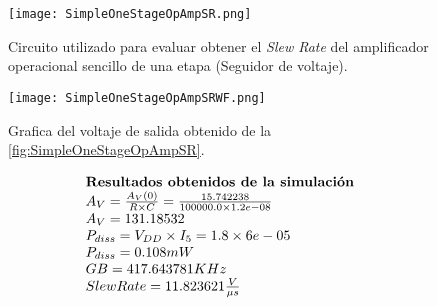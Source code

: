 \begin{figure}[ht]
	\centering
	\texttt{[image: SimpleOneStageOpAmpSR.png]}
	\caption{Circuito utilizado para evaluar obtener el \textit{Slew Rate} del amplificador operacional sencillo de una etapa (Seguidor de voltaje). \label{fig:SimpleOneStageOpAmpSR}}
\end{figure}

\begin{figure}[ht]
	\centering
	\texttt{[image: SimpleOneStageOpAmpSRWF.png]}
	\caption{Grafica del voltaje de salida obtenido de la \autoref{fig:SimpleOneStageOpAmpSR}. \label{fig:SimpleOneStageOpAmpSRWF}}
\end{figure}

\begin{equation*}
	\begin{array}{l l}
		\textbf{Resultados obtenidos de la simulación} \\
		A_{V} = \frac{A_{V}(0)}{R \times C} = \frac{ 15.742238 }{ 100000.0 \times 1.2e-08 } \\
		A_{V} =  131.18532  \\
		P_{diss} = V_{DD} \times I_{5} =  1.8 \times 6e-05  \\
		P_{diss} =  0.108  mW \\
		GB =  417.643781  KHz \\
		Slew Rate =  11.823621 \frac{V}{\mu s} \\
	\end{array}
\end{equation*}